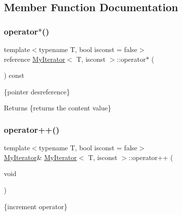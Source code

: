 \subsection{Member Function Documentation}
\mbox{\label{classMyIterator_aef723487fdda934f8b6ca6fbd2136e11}} 
\subsubsection{\texorpdfstring{operator$\ast$()}{operator*()}}
{\footnotesize\ttfamily template$<$typename T, bool isconst = false$>$ \\
reference \hyperlink{classMyIterator}{My\+Iterator}$<$ T, isconst $>$\+::operator$\ast$ (\begin{DoxyParamCaption}{ }\end{DoxyParamCaption}) const\hspace{0.3cm}{\ttfamily [inline]}}



\{pointer desreference\} 

\begin{DoxyReturn}{Returns}
\{returns the content value\} 
\end{DoxyReturn}
\mbox{\label{classMyIterator_a07598b2a8227dba516a2d40289294a23}} 
\subsubsection{\texorpdfstring{operator++()}{operator++()}\hspace{0.1cm}{\footnotesize\ttfamily [1/2]}}
{\footnotesize\ttfamily template$<$typename T, bool isconst = false$>$ \\
\hyperlink{classMyIterator}{My\+Iterator}\& \hyperlink{classMyIterator}{My\+Iterator}$<$ T, isconst $>$\+::operator++ (\begin{DoxyParamCaption}\item[{void}]{ }\end{DoxyParamCaption})\hspace{0.3cm}{\ttfamily [inline]}}



\{increment operator\} 

